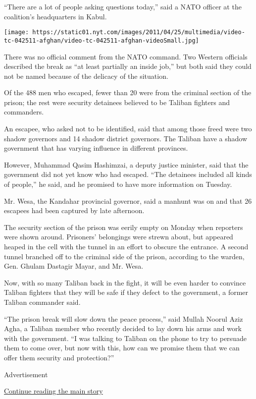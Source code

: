 ``There are a lot of people asking questions today,'' said a NATO
officer at the coalition's headquarters in Kabul.

\texttt{[image: https://static01.nyt.com/images/2011/04/25/multimedia/video-tc-042511-afghan/video-tc-042511-afghan-videoSmall.jpg]}

There was no official comment from the NATO command. Two Western
officials described the break as ``at least partially an inside job,''
but both said they could not be named because of the delicacy of the
situation.

Of the 488 men who escaped, fewer than 20 were from the criminal section
of the prison; the rest were security detainees believed to be Taliban
fighters and commanders.

An escapee, who asked not to be identified, said that among those freed
were two shadow governors and 14 shadow district governors. The Taliban
have a shadow government that has varying influence in different
provinces.

However, Muhammad Qasim Hashimzai, a deputy justice minister, said that
the government did not yet know who had escaped. ``The detainees
included all kinds of people,'' he said, and he promised to have more
information on Tuesday.

Mr. Wesa, the Kandahar provincial governor, said a manhunt was on and
that 26 escapees had been captured by late afternoon.

The security section of the prison was eerily empty on Monday when
reporters were shown around. Prisoners' belongings were strewn about,
but appeared heaped in the cell with the tunnel in an effort to obscure
the entrance. A second tunnel branched off to the criminal side of the
prison, according to the warden, Gen. Ghulam Dastagir Mayar, and Mr.
Wesa.

Now, with so many Taliban back in the fight, it will be even harder to
convince Taliban fighters that they will be safe if they defect to the
government, a former Taliban commander said.

``The prison break will slow down the peace process,'' said Mullah
Noorul Aziz Agha, a Taliban member who recently decided to lay down his
arms and work with the government. ``I was talking to Taliban on the
phone to try to persuade them to come over, but now with this, how can
we promise them that we can offer them security and protection?''

Advertisement

\protect\hyperlink{after-bottom}{Continue reading the main story}

